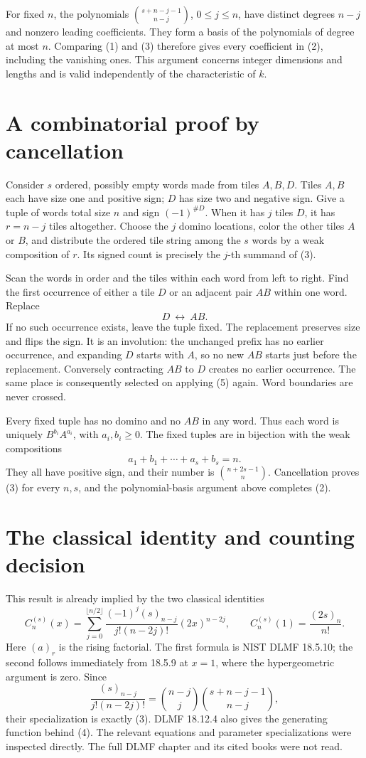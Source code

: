 \documentclass[11pt]{article}
\begin{document}
For fixed \(n\), the polynomials
\(\binom{s+n-j-1}{n-j}\), \(0\leq j\leq n\), have distinct
degrees \(n-j\) and nonzero leading coefficients. They form a basis
of the polynomials of degree at most \(n\). Comparing (1) and (3)
therefore gives every coefficient in (2), including the vanishing
ones. This argument concerns integer dimensions and lengths and is
valid independently of the characteristic of \(k\).

\section*{A combinatorial proof by cancellation}
Consider \(s\) ordered, possibly empty words made from tiles \(A,B,D\).
Tiles \(A,B\) each have size one and positive sign; \(D\) has size
two and negative sign. Give a tuple of words total size \(n\) and
sign \((-1)^{\#D}\). When it has \(j\) tiles \(D\), it has
\(r=n-j\) tiles altogether. Choose the \(j\) domino locations,
color the other tiles \(A\) or \(B\), and distribute the ordered
tile string among the \(s\) words by a weak composition of \(r\).
Its signed count is precisely the \(j\)-th summand of (3).

Scan the words in order and the tiles within each word from left
to right. Find the first occurrence of either a tile \(D\) or an
adjacent pair \(AB\) within one word. Replace
\[
                        D\ \longleftrightarrow\ AB.         \tag{5}
\]
If no such occurrence exists, leave the tuple fixed. The replacement
preserves size and flips the sign. It is an involution: the unchanged
prefix has no earlier occurrence, and expanding \(D\) starts with
\(A\), so no new \(AB\) starts just before the replacement.
Conversely contracting \(AB\) to \(D\) creates no earlier occurrence.
The same place is consequently selected on applying (5) again.
Word boundaries are never crossed.

Every fixed tuple has no domino and no \(AB\) in any word. Thus each
word is uniquely \(B^{b_i}A^{a_i}\), with \(a_i,b_i\geq0\).
The fixed tuples are in bijection with the weak compositions
\[
                  a_1+b_1+\cdots+a_s+b_s=n.
\]
They all have positive sign, and their number is
\(\binom{n+2s-1}{n}\). Cancellation proves (3) for every \(n,s\),
and the polynomial-basis argument above completes (2).

\section*{The classical identity and counting decision}
This result is already implied by the two classical identities
\[
 C_n^{(s)}(x)=\sum_{j=0}^{\lfloor n/2\rfloor}
       \frac{(-1)^j(s)_{n-j}}{j!(n-2j)!}(2x)^{n-2j},\qquad
 C_n^{(s)}(1)=\frac{(2s)_n}{n!}.                            \tag{6}
\]
Here \((a)_r\) is the rising factorial. The first formula is NIST
DLMF 18.5.10; the second follows immediately from 18.5.9 at \(x=1\),
where the hypergeometric argument is zero. Since
\[
 \frac{(s)_{n-j}}{j!(n-2j)!}
       =\binom{n-j}{j}\binom{s+n-j-1}{n-j},
\]
their specialization is exactly (3). DLMF 18.12.4 also gives the
generating function behind (4). The relevant equations and parameter
specializations were inspected directly. The full DLMF chapter and
its cited books were not read.
\end{document}
